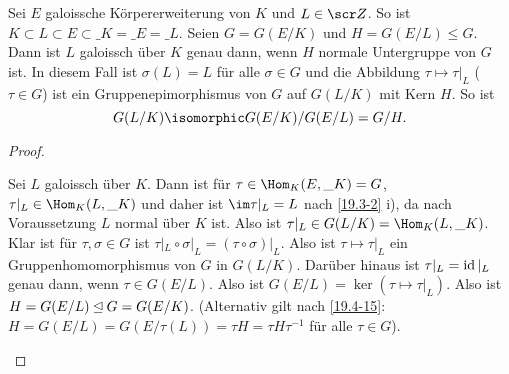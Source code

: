 \begin{st} \label{19.4-17}
	Sei $E$ galoissche Körpererweiterung von $K$ und $L \in \scr Z$.
	So ist $K \subset L \subset E \subset \_K = \_E = \_L$.
	Seien $G = G(E / K)$ und $H = G(E / L) \le G$.
	Dann ist $L$ galoissch über $K$ genau dann, wenn $H$ normale Untergruppe von $G$ ist.
	In diesem Fall ist $\sigma(L) = L$ für alle $\sigma \in G$ und die Abbildung $\tau \mapsto \tau|_L$ ($\tau \in G$) ist ein Gruppenepimorphismus von $G$ auf $G(L / K)$ mit Kern $H$.
	So ist
	\[
		G(L / K) \isomorphic G(E / K) / G(E / L) = G / H.
	\]
	\begin{proof}
		\begin{segnb}[$\implies$]
			Sei $L$ galoissch über $K$.
			Dann ist für $\tau \in \Hom_K(E, \_K) = G$, $\tau|_L \in \Hom_K(L, \_K)$ und daher ist $\im \tau|_L = L$ nach \ref{19.3-2} i), da nach Voraussetzung $L$ normal über $K$ ist.
			Also ist $\tau|_L \in G(L / K) = \Hom_K(L, \_K)$.
			Klar ist für $\tau, \sigma \in G$ ist $\tau|_L \circ \sigma|_L = (\tau \circ \sigma)|_L$.
			Also ist $\tau \mapsto \tau|_L$ ein Gruppenhomomorphismus von $G$ in $G(L / K)$.
			Darüber hinaus ist $\tau|_L = \operatorname{id}|_L$ genau dann, wenn $\tau \in G(E / L)$.
			Also ist $G(E / L) = \ker(\tau \mapsto \tau|_L)$.
			Also ist $H = G(E / L) \mathbin{\trianglelefteq} G = G(E / K)$.
			(Alternativ gilt nach \ref{19.4-15}: $H = G(E / L) = G(E / \tau(L)) = \tau H = \tau H \tau^{-1}$ für alle $\tau \in G$).


\end{segnb}
\end{proof}
\end{st}
